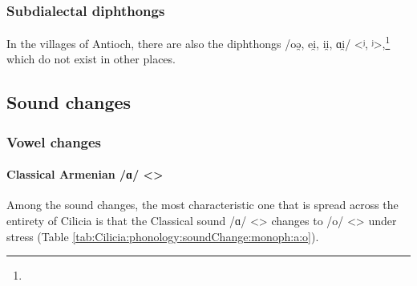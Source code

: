 \subsubsection{Subdialectal diphthongs}\label{sec:Cilicia:phono:segment:subdialect:diph}
In the villages of Antioch, there are also the diphthongs /oə̯, ei̯, ii̯, ɑi̯/ <ʲ, ʲ>,\footnote{} which do not exist in other places. 


\subsection{Sound changes}

\subsubsection{Vowel changes}

\paragraph{Classical Armenian /ɑ/ <>}
Among the sound changes, the most characteristic one that is spread across the entirety of Cilicia is that the Classical sound /ɑ/ <> changes to /o/ <> under stress (Table \ref{tab:Cilicia:phonology:soundChange:monoph:a:o}). 




